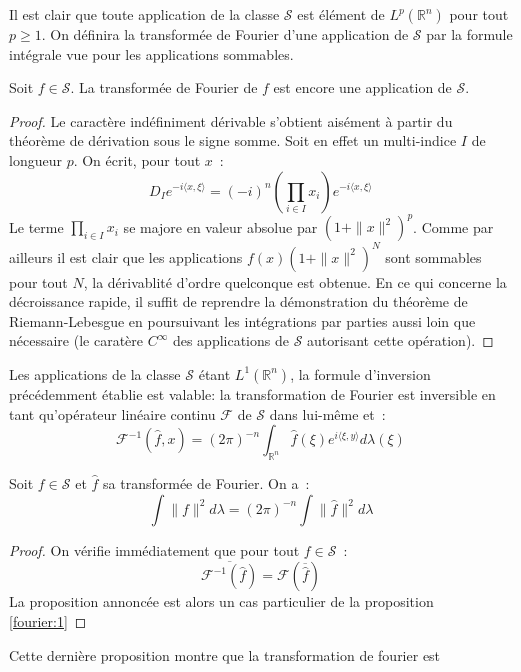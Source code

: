 Il est clair que toute application de la classe $\mathcal{S}$ est
élément de $L^p(\mathbb{R}^n)$ pour tout $p \geq 1$. On définira la
transformée de Fourier d'une application de $\mathcal{S}$ par la
formule intégrale vue pour les applications sommables. 
\begin{mandatory}
\begin{prop}
Soit $f \in \mathcal{S}$. La transformée de Fourier de $f$ est encore
une application de $\mathcal{S}$.
\end{prop}
\end{mandatory}
\begin{proof}
Le caractère indéfiniment dérivable s'obtient aisément à partir du
théorème de dérivation sous le signe somme. Soit en effet un
multi-indice $I$ de longueur $p$. On écrit, pour tout $x$~:
\[
D_I e^{- i \langle x, \xi \rangle} = (-i)^n \left (\prod_{i \in I} x_i
\right )  e^{- i \langle x, \xi \rangle}
\]
Le terme $\prod_{i \in I} x_i$ se majore en valeur absolue par
$(1+\|x\|^2)^p$. Comme par ailleurs il est clair que les applications
$f(x)(1+\|x\|^2)^N$ sont sommables pour tout $N$, la dérivablité
d'ordre quelconque est obtenue.
En ce qui concerne la décroissance rapide, il suffit de reprendre la
démonstration du théorème de Riemann-Lebesgue en poursuivant les
intégrations par parties aussi loin que nécessaire (le caratère
$C^\infty$ des applications de $\mathcal{S}$ autorisant cette opération).
\end{proof}
Les applications de la classe $\mathcal{S}$ étant $L^1(\mathbb{R}^n)$, la
formule d'inversion précédemment établie est valable: la transformation de
Fourier est inversible en tant qu'opérateur linéaire continu $\mathcal{F}$ de
$\mathcal{S}$ dans lui-même et~:
\[
\mathcal{F}^{-1}(\widehat{f},x) = (2 \pi)^{-n} \int_{\mathbb{R}^n}
\widehat{f}(\xi) e^{i\langle \xi, y\rangle} d \lambda(\xi)
\]
\begin{mandatory}
\begin{prop}
Soit $f \in \mathcal{S}$ et $\widehat{f}$ sa transformée de
Fourier. On a~:
\[
 \int \|f\|^2 d \lambda = (2\pi)^{-n} \int \|\widehat{f}\|^2 d \lambda
\]
\end{prop}
\end{mandatory}
\begin{proof}
On vérifie immédiatement que pour tout $f \in \mathcal{S}$~:
\[
\overline{\mathcal{F}^{-1}(\widehat{f})} = \mathcal{F}(\overline{\widehat{f}})
\]
La proposition annoncée est alors un cas particulier de la proposition \ref{fourier:1}
\end{proof}
Cette dernière proposition montre que la transformation de fourier est
